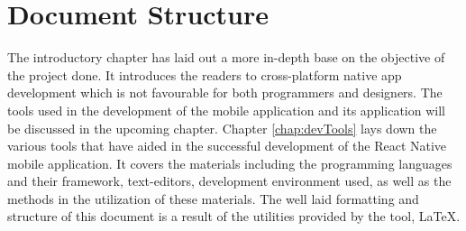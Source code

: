 \section{Document Structure}
The introductory chapter has laid out a more in-depth base on the objective of the project done. It introduces the readers to cross-platform native app development which is not favourable for both programmers and designers. The tools used in the development of the mobile application and its application will be discussed in the upcoming chapter.
Chapter \ref{chap:devTools} lays down the various tools that have aided in the successful development of the React Native mobile application. It covers the materials including the programming languages and their framework, text-editors, development environment used, as well as the methods in the utilization of these materials.
The well laid formatting and structure of this document is a result of the utilities provided by the tool, \LaTeX. 